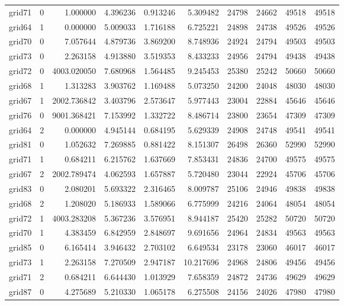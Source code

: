 \begin{longtable}{|l|r|r|r|r|r|r|r|r|r|}
grid71 & 0 & 1.000000 & 4.396236 & 0.913246 & 5.309482 & 24798 & 24662 & 49518 & 49518 \\
grid64 & 1 & 0.000000 & 5.009033 & 1.716188 & 6.725221 & 24898 & 24738 & 49526 & 49526 \\
grid70 & 0 & 7.057644 & 4.879736 & 3.869200 & 8.748936 & 24924 & 24794 & 49503 & 49503 \\
grid73 & 0 & 2.263158 & 4.913880 & 3.519353 & 8.433233 & 24956 & 24794 & 49438 & 49438 \\
grid72 & 0 & 4003.020050 & 7.680968 & 1.564485 & 9.245453 & 25380 & 25242 & 50660 & 50660 \\
grid68 & 1 & 1.313283 & 3.903762 & 1.169488 & 5.073250 & 24200 & 24048 & 48030 & 48030 \\
grid67 & 1 & 2002.736842 & 3.403796 & 2.573647 & 5.977443 & 23004 & 22884 & 45646 & 45646 \\
grid76 & 0 & 9001.368421 & 7.153992 & 1.332722 & 8.486714 & 23800 & 23654 & 47309 & 47309 \\
grid64 & 2 & 0.000000 & 4.945144 & 0.684195 & 5.629339 & 24908 & 24748 & 49541 & 49541 \\
grid81 & 0 & 1.052632 & 7.269885 & 0.881422 & 8.151307 & 26498 & 26360 & 52990 & 52990 \\
grid71 & 1 & 0.684211 & 6.215762 & 1.637669 & 7.853431 & 24836 & 24700 & 49575 & 49575 \\
grid67 & 2 & 2002.789474 & 4.062593 & 1.657887 & 5.720480 & 23044 & 22924 & 45706 & 45706 \\
grid83 & 0 & 2.080201 & 5.693322 & 2.316465 & 8.009787 & 25106 & 24946 & 49838 & 49838 \\
grid68 & 2 & 1.208020 & 5.186933 & 1.589066 & 6.775999 & 24216 & 24064 & 48054 & 48054 \\
grid72 & 1 & 4003.283208 & 5.367236 & 3.576951 & 8.944187 & 25420 & 25282 & 50720 & 50720 \\
grid70 & 1 & 4.383459 & 6.842959 & 2.848697 & 9.691656 & 24964 & 24834 & 49563 & 49563 \\
grid85 & 0 & 6.165414 & 3.946432 & 2.703102 & 6.649534 & 23178 & 23060 & 46017 & 46017 \\
grid73 & 1 & 2.263158 & 7.270509 & 2.947187 & 10.217696 & 24968 & 24806 & 49456 & 49456 \\
grid71 & 2 & 0.684211 & 6.644430 & 1.013929 & 7.658359 & 24872 & 24736 & 49629 & 49629 \\
grid87 & 0 & 4.275689 & 5.210330 & 1.065178 & 6.275508 & 24156 & 24026 & 47980 & 47980 \\

\end{longtable}

